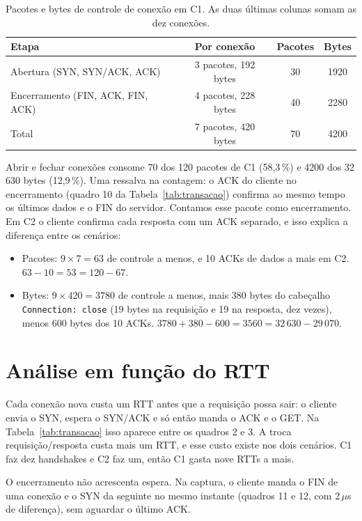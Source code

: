 \documentclass[11pt,a4paper]{article}
\newcommand{\cod}[1]{\texttt{#1}}
\begin{document}
\begin{table}[H]
\centering
\small
\begin{tabular}{@{}lccc@{}}
\toprule
\textbf{Etapa} & \textbf{Por conexão} & \textbf{Pacotes} & \textbf{Bytes} \\
\midrule
Abertura (SYN, SYN/ACK, ACK) & 3 pacotes, 192 bytes & 30 & 1920 \\
Encerramento (FIN, ACK, FIN, ACK) & 4 pacotes, 228 bytes & 40 & 2280 \\
\midrule
Total & 7 pacotes, 420 bytes & 70 & 4200 \\
\bottomrule
\end{tabular}
\caption{Pacotes e bytes de controle de conexão em C1. As duas últimas colunas somam as dez conexões.}
\label{tab:overhead}
\end{table}

Abrir e fechar conexões consome 70 dos 120 pacotes de C1 (58,3\,\%) e 4200
dos 32\,630 bytes (12,9\,\%). Uma ressalva na contagem: o ACK do cliente no
encerramento (quadro 10 da Tabela~\ref{tab:transacao}) confirma ao mesmo tempo
os últimos dados e o FIN do servidor. Contamos esse pacote como encerramento.
Em C2 o cliente confirma cada resposta com um ACK separado, e isso explica a
diferença entre os cenários:

\begin{itemize}
  \item Pacotes: $9 \times 7 = 63$ de controle a menos, e 10 ACKs de dados a
  mais em C2. $63 - 10 = 53 = 120 - 67$.
  \item Bytes: $9 \times 420 = 3780$ de controle a menos, mais 380 bytes do
  cabeçalho \cod{Connection: close} (19 bytes na requisição e 19 na resposta,
  dez vezes), menos 600 bytes dos 10 ACKs. $3780 + 380 - 600 = 3560 =
  32\,630 - 29\,070$.
\end{itemize}

\section{Análise em função do RTT}

Cada conexão nova custa um RTT antes que a requisição possa sair: o cliente
envia o SYN, espera o SYN/ACK e só então manda o ACK e o GET. Na
Tabela~\ref{tab:transacao} isso aparece entre os quadros 2 e 3. A troca
requisição/resposta custa mais um RTT, e esse custo existe nos dois cenários.
C1 faz dez handshakes e C2 faz um, então C1 gasta nove RTTs a mais.

O encerramento não acrescenta espera. Na captura, o cliente manda o FIN de uma
conexão e o SYN da seguinte no mesmo instante (quadros 11 e 12, com 2\,$\mu$s de
diferença), sem aguardar o último ACK.
\end{document}
